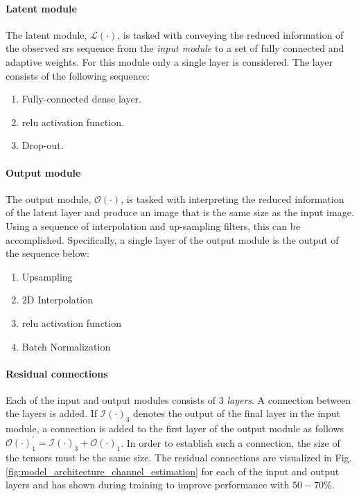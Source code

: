\paragraph{Latent module}
The latent module, $\mathcal{L}(\cdot)$, is tasked with conveying the reduced information of the observed \gls{srs} sequence from the \textit{input module} to a set of fully connected and adaptive weights. For this module only a single layer is considered. The layer consists of the following sequence:
\begin{enumerate}
    \item Fully-connected dense layer.
    \item \gls{relu} activation function.
    \item Drop-out.
\end{enumerate}

\paragraph{Output module}
The output module, $\mathcal{O}(\cdot)$, is tasked with interpreting the reduced information of the latent layer and produce an image that is the same size as the input image. Using a sequence of interpolation and up-sampling filters, this can be accomplished. Specifically, a single layer of the output module is the output of the sequence below:

\begin{enumerate}
    \item Upsampling
    \item 2D Interpolation
    \item \gls{relu} activation function
    \item Batch Normalization
\end{enumerate}


\paragraph{Residual connections}
Each of the input and output modules consists of 3 \emph{layers}. A connection between the layers is added. If $\mathcal{I}(\cdot)_3$ denotes the output of the final layer in the input module, a connection is added to the first layer of the output module as follows $\mathcal{O}(\cdot)_{1}^{'} = \mathcal{I}(\cdot)_3  + \mathcal{O}(\cdot)_1$. In order to establish such a connection, the size of the tensors must be the same size. The residual connections are visualized in Fig. \ref{fig:model_architecture_channel_estimation} for each of the input and output layers and has shown during training to improve performance with $50-70\%$.

